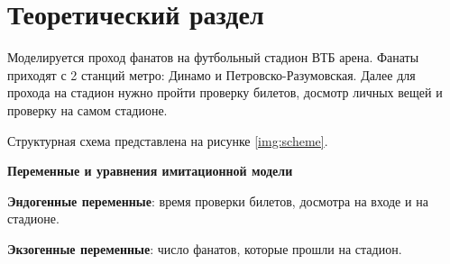 \chapter{Теоретический раздел}

Моделируется проход фанатов на футбольный стадион ВТБ арена. Фанаты приходят с 2 станций метро: Динамо и Петровско-Разумовская. Далее для прохода на стадион нужно пройти проверку билетов, досмотр личных вещей и проверку на самом стадионе.

Структурная схема представлена на рисунке \ref{img:scheme}.


\textbf{Переменные и уравнения имитационной модели}  

\textbf{Эндогенные переменные}: время проверки билетов, досмотра на входе и на стадионе.

\textbf{Экзогенные переменные}: число фанатов, которые прошли на стадион.

